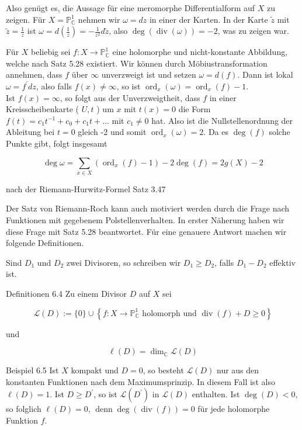 \documentclass[10pt, letterpaper]{article}
\begin{document}
Also genügt es, die Aussage für eine meromorphe Differentialform auf $X$ zu zeigen. Für $X=\mathbb{P}_{\mathbb{C}}^{1}$ nehmen wir $\omega=d z$ in einer der Karten. In der Karte $\widetilde{z}$ mit $\widetilde{z}=\frac{1}{z}$ ist $\omega=d\left(\frac{1}{z}\right)=-\frac{1}{z^{2}} d \widetilde{z}$, also $\operatorname{deg}(\operatorname{div}(\omega))=-2$, was zu zeigen war.

Für $X$ beliebig sei $f: X \longrightarrow \mathbb{P}_{\mathbb{C}}^{1}$ eine holomorphe und nicht-konstante Abbildung, welche nach Satz 5.28 existiert. Wir können durch Möbiustransformation annehmen, dass $f$ über $\infty$ unverzweigt ist und setzen $\omega=d(f)$. Dann ist lokal $\omega=f^{\prime} d z$, also falls $f(x) \neq \infty$, so ist $\operatorname{ord}_{x}(\omega)=\operatorname{ord}_{x}(f)-1$.\\
Ist $f(x)=\infty$, so folgt aus der Unverzweigtheit, dass $f$ in einer Kreisscheibenkarte ( $U, t$ ) um $x$ mit $t(x)=0$ die Form $f(t)=c_{1} t^{-1}+c_{0}+c_{1} t+\ldots$ mit $c_{1} \neq 0$ hat. Also ist die Nullstellenordnung der Ableitung bei $t=0$ gleich -2 und somit $\operatorname{ord}_{x}(\omega)=2$. Da es $\operatorname{deg}(f)$ solche Punkte gibt, folgt insgesamt

$$
\operatorname{deg} \omega=\sum_{x \in X}\left(\operatorname{ord}_{x}(f)-1\right)-2 \operatorname{deg}(f)=2 g(X)-2
$$

nach der Riemann-Hurwitz-Formel Satz 3.47

Der Satz von Riemann-Roch kann auch motiviert werden durch die Frage nach Funktionen mit gegebenem Polstellenverhalten. In erster Näherung haben wir diese Frage mit Satz 5.28 beantwortet. Für eine genauere Antwort machen wir folgende Definitionen.

Sind $D_{1}$ und $D_{2}$ zwei Divisoren, so schreiben wir $D_{1} \geqslant D_{2}$, falls $D_{1}-D_{2}$ effektiv ist.

Definitionen 6.4 Zu einem Divisor $D$ auf $X$ sei

$$
\mathcal{L}(D):=\{0\} \cup\left\{f: X \longrightarrow \mathbb{P}_{\mathbb{C}}^{1} \text { holomorph und } \operatorname{div}(f)+D \geqslant 0\right\}
$$

und

$$
\ell(D)=\operatorname{dim}_{\mathbb{C}} \mathcal{L}(D)
$$

Beispiel 6.5 Ist $X$ kompakt und $D=0$, so besteht $\mathcal{L}(D)$ nur aus den konstanten Funktionen nach dem Maximumsprinzip. In diesem Fall ist also $\ell(D)=1$. Ist $D \geqslant D^{\prime}$, so ist $\mathcal{L}\left(D^{\prime}\right)$ in $\mathcal{L}(D)$ enthalten. Ist $\operatorname{deg}(D)<0$, so folglich $\ell(D)=0$, $\operatorname{denn} \operatorname{deg}(\operatorname{div}(f))=0$ für jede holomorphe Funktion $f$.
\end{document}
